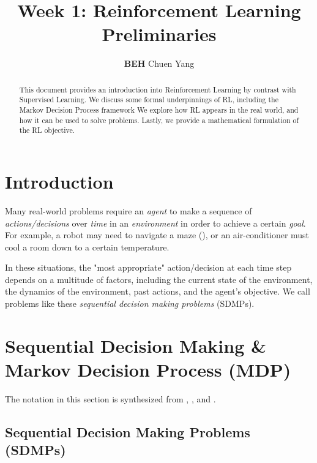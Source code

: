 \documentclass{article} %
\title{Week 1: Reinforcement Learning Preliminaries}
\author{\textbf{BEH} Chuen Yang}
\begin{document}
\ifcolmsubmission
\linenumbers
\fi

\maketitle

\begin{abstract}
This document provides an introduction into Reinforcement Learning by contrast with Supervised Learning. 
We discuss some formal underpinnings of RL, including the Markov Decision Process framework
We explore how RL appears in the real world, and how it can be used to solve problems.
Lastly, we provide a mathematical formulation of the RL objective.
\end{abstract}

\section{Introduction}
Many real-world problems require an \textit{agent} to make a sequence of 
\textit{actions/decisions} over \textit{time} in an \textit{environment} 
in order to achieve a certain \textit{goal}.
For example, a robot may need to navigate a maze (\cite{Muller-2023}), 
or an air-conditioner must cool a room down to a certain temperature.

In these situations, the "most appropriate" action/decision at each time step depends
on a multitude of factors, including the current state of the environment,
the dynamics of the environment, past actions, and the agent's objective.
We call problems like these \textit{sequential decision making problems} (SDMPs).

\section{Sequential Decision Making \& Markov Decision Process (MDP)}
The notation in this section is synthesized from \cite{SpinningUp-2018}, \cite{Levine-et-al-2023}, and \cite{Sutton-and-Barto-1998}.

\subsection{Sequential Decision Making Problems (SDMPs)}
\end{document}
